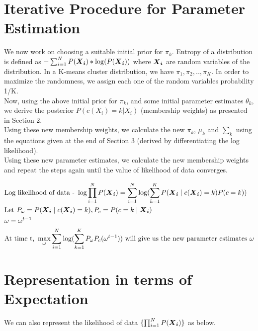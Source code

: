 \documentclass[12pt]{article}
\begin{document}
\section{Iterative Procedure for Parameter Estimation}

We now work on choosing a suitable initial prior for $\pi_k$. 
Entropy of a distribution is defined as $-\sum_{i=1}^{N} P(\bm{{\boldsymbol X}_{i}}) * \log(P(\bm{{\boldsymbol X}_{i}})) $ where $\bm{{\boldsymbol X}_{i}}$ are random variables of the distribution. In a K-means cluster distribution, we have $\pi_1, \pi_2, .. , \pi_K$. In order to maximize the randomness, we assign each one of the random variables probability 1/K. \\

Now, using the above initial prior for $\pi_k$, and some initial parameter estimates $\theta_k$, we derive the posterior $P(c(X_i) = k | X_i)$ (membership weights) as presented in Section 2. \\

Using these new membership weights, we calculate the new $\pi_k$, $\mu_k$ and $\sum_k$ using the equations given at the end of Section 3 (derived by differentiating the log likelihood). \\

Using these new parameter estimates, we calculate the new membership weights and repeat the steps again until the value of likelihood of data converges.

\begin{gather*}
\begin{aligned}
    & \text{Log likelihood of data - } \log\prod_{i=1}^{N} P(\bm{{\boldsymbol X}_{i}}) =  \sum_{i=1}^{N} \log(\sum_{k=1}^{K} P(\bm{{\boldsymbol X}_{i}} \mid c(\bm{{\boldsymbol X}_{i}}) = k) P(c = k)) \\
    & \text{Let } P_\omega = P(\bm{{\boldsymbol X}_{i}} \mid c(\bm{{\boldsymbol X}_{i}}) = k), P_c = P(c=k \mid \bm{{\boldsymbol X}_{i}})\\
    & \omega = \omega^{t-1}\\
    & \text{At time t,  } \max_{\omega}  \sum_{i=1}^{N} \log(\sum_{k=1}^{K} P_\omega P_c(\omega^{t-1})) \text{ will give us the new parameter estimates  } \omega
\end{aligned}
\end{gather*}


\section{Representation in terms of Expectation}
We can also represent the likelihood of data $\{\prod_{i=1}^{N} P(\bm{{\boldsymbol X}_{i}})\}$ as below.
\end{document}
